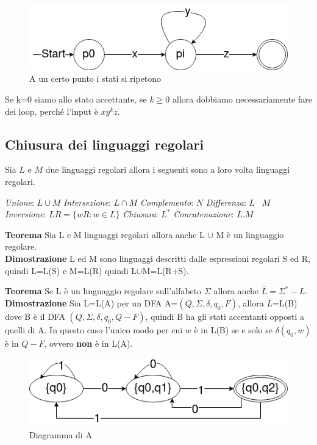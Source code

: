 \documentclass[12pt]{article}
\begin{document}
	\begin{figure}[h]
		\includegraphics[scale = 0.5]{media/pump.png}
		\centering
		\caption{A un certo punto i stati si ripetono}
	\end{figure}

	Se k=0 siamo allo stato accettante, se $k \geq 0$ allora dobbiamo necessariamente fare dei loop, perché l'input è $xy^kz$.

	\newpage
	\subsection{Chiusura dei linguaggi regolari}
	Sia $L$ e $M$ due linguaggi regolari allora i seguenti sono a loro volta linguaggi regolari.
	\begin{outline}
		\1 \emph{Unione}: $L \cup M$
		\1 \emph{Intersezione}: $L \cap M$
		\1 \emph{Complemento}: $N$
		\1 \emph{Differenza}: $L$ \ $M$
		\1 \emph{Inversione}: $LR = \{wR : w \in L\}$
		\1 \emph{Chiusura}: $L^*$
		\1 \emph{Concatenazione}: $L.M$
	\end{outline}
	\textbf{Teorema} Sia L e M linguaggi regolari allora anche L $\cup$ M è un linguaggio regolare.
	\\ \textbf{Dimostrazione} L ed M sono linguaggi descritti dalle espressioni regolari S ed R, quindi L=L(S) e M=L(R) quindi L$\cup$M=L(R+S).
  \vspace{5mm}

\textbf{Teorema} Se L è un linguaggio regolare sull'alfabeto $\Sigma$ allora anche $\overline{L}=\Sigma^*-L$.
\\ \textbf{Dimostrazione} Sia L=L(A) per un DFA A=$(Q,\Sigma,\delta,q_0,F)$, allora $\overline{L}$=L(B) dove B è il DFA $(Q,\Sigma,\delta,q_0,Q-F)$, quindi B ha gli stati accentanti opposti a quelli di A. In questo caso l'unico modo per cui $w$ è in L(B) se e solo se $\delta(q_0,w)$ è in $Q-F$, ovvero \textbf{non} è in L(A).

\begin{figure}[h]
  \includegraphics[scale = 0.5]{media/prop1.png}
  \centering
  \caption{Diagramma di A}
\end{figure}
\end{document}
